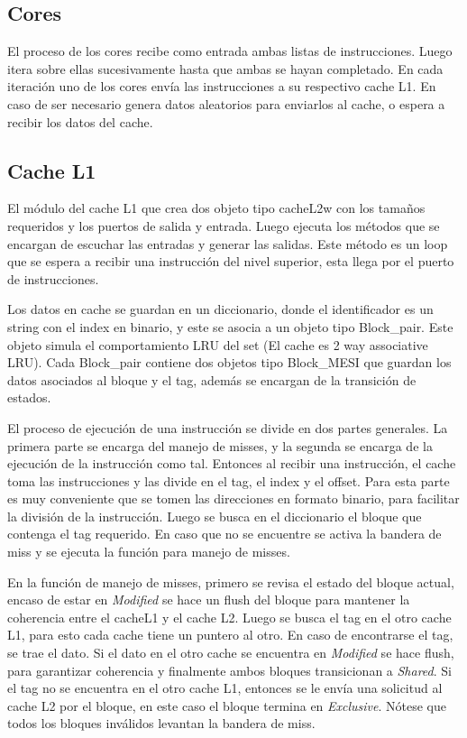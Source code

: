 \documentclass {article}
\begin{document}
\subsection{Cores}

El proceso de los cores recibe como entrada ambas listas de instrucciones. Luego itera sobre ellas
sucesivamente hasta que ambas se hayan completado. En cada iteración uno de los cores envía las
instrucciones a su respectivo cache L1. En caso de ser necesario genera datos aleatorios para
enviarlos al cache, o espera a recibir los datos del cache. 


\subsection{Cache L1}
El módulo del cache L1 que crea dos objeto tipo cacheL2w con los tamaños requeridos y los puertos de
salida y entrada. Luego ejecuta los métodos que se encargan de escuchar las entradas y generar las
salidas. Este método es un loop que se espera a recibir una instrucción del nivel superior, esta
llega por el puerto de instrucciones.

Los datos en cache se guardan en un diccionario, donde el identificador es un string con el index en
binario, y este se asocia a un objeto tipo Block\_pair. Este objeto simula el comportamiento LRU del
set (El cache es 2 way associative LRU). Cada Block\_pair contiene dos objetos tipo Block\_MESI que
guardan los datos asociados al bloque y el tag, además se encargan de la transición de estados. 

El proceso de ejecución de una instrucción se divide en dos partes generales. La primera parte se
encarga del manejo de misses, y la segunda se encarga de la ejecución de la instrucción como
tal. Entonces al recibir una instrucción, el cache toma las instrucciones y las divide en el tag, el
index y el offset. Para esta parte es muy conveniente que se tomen las direcciones en formato
binario, para facilitar la división de la instrucción. Luego se busca en el diccionario el bloque
que contenga el tag requerido. En caso que no se encuentre se activa la bandera de miss y se ejecuta
la función para manejo de misses.

En la función de manejo de misses, primero se revisa el estado del bloque actual, encaso de estar en
\textit{Modified} se hace un flush del bloque para mantener la coherencia entre el cacheL1 y el
cache L2. Luego se busca el tag en el otro cache L1, para esto cada cache tiene un puntero al
otro. En caso de encontrarse el tag, se trae el dato. Si el dato en el otro cache se encuentra en
\textit{Modified} se hace flush, para garantizar coherencia y finalmente ambos bloques transicionan
a \textit{Shared}. Si el tag no se encuentra en el otro cache L1, entonces se le envía una solicitud
al cache L2 por el bloque, en este caso el bloque termina en \textit{Exclusive}. Nótese que todos
los bloques inválidos levantan la bandera de miss.
\end{document}
